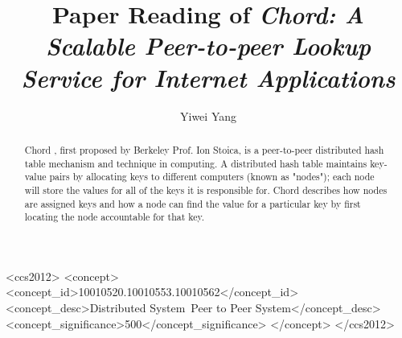 \documentclass[acmlarge]{acmart}
\begin{document}
\title{Paper Reading of \textit{Chord: A Scalable Peer-to-peer Lookup Service for Internet Applications}}

\author{Yiwei Yang}

\renewcommand{\shortauthors}{Yiwei Yang}

\begin{abstract}
  Chord \cite{stoica2003chord}, first proposed by Berkeley Prof. Ion Stoica, is a peer-to-peer distributed hash table mechanism and technique in computing. A distributed hash table maintains key-value pairs by allocating keys to different computers (known as "nodes"); each node will store the values for all of the keys it is responsible for. Chord describes how nodes are assigned keys and how a node can find the value for a particular key by first locating the node accountable for that key.
\end{abstract}

\begin{CCSXML}
  <ccs2012>
  <concept>
  <concept_id>10010520.10010553.10010562</concept_id>
  <concept_desc>Distributed System~Peer to Peer System</concept_desc>
  <concept_significance>500</concept_significance>
  </concept>
  </ccs2012>
\end{CCSXML}


\keywords{}
\end{document}
